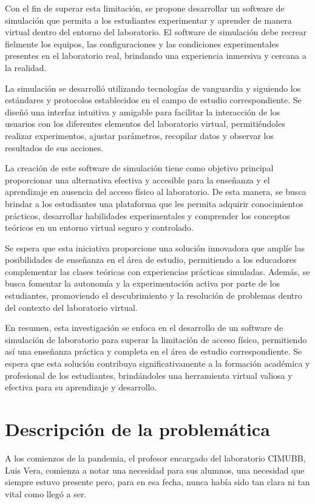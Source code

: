 Con el fin de superar esta limitación, se propone desarrollar un software de simulación que permita a los estudiantes experimentar y aprender de manera virtual dentro del entorno del laboratorio. El software de simulación debe recrear fielmente los equipos, las configuraciones y las condiciones experimentales presentes en el laboratorio real, brindando una experiencia inmersiva y cercana a la realidad.

La simulación se desarrolló utilizando tecnologías de vanguardia y siguiendo los estándares y protocolos establecidos en el campo de estudio correspondiente. Se diseñó una interfaz intuitiva y amigable para facilitar la interacción de los usuarios con los diferentes elementos del laboratorio virtual, permitiéndoles realizar experimentos, ajustar parámetros, recopilar datos y observar los resultados de sus acciones.

La creación de este software de simulación tiene como objetivo principal proporcionar una alternativa efectiva y accesible para la enseñanza y el aprendizaje en ausencia del acceso físico al laboratorio. De esta manera, se busca brindar a los estudiantes una plataforma que les permita adquirir conocimientos prácticos, desarrollar habilidades experimentales y comprender los conceptos teóricos en un entorno virtual seguro y controlado.

Se espera que esta iniciativa proporcione una solución innovadora que amplíe las posibilidades de enseñanza en el área de estudio, permitiendo a los educadores complementar las clases teóricas con experiencias prácticas simuladas. Además, se busca fomentar la autonomía y la experimentación activa por parte de los estudiantes, promoviendo el descubrimiento y la resolución de problemas dentro del contexto del laboratorio virtual.

En resumen, esta investigación se enfoca en el desarrollo de un software de simulación de laboratorio para superar la limitación de acceso físico, permitiendo así una enseñanza práctica y completa en el área de estudio correspondiente. Se espera que esta solución contribuya significativamente a la formación académica y profesional de los estudiantes, brindándoles una herramienta virtual valiosa y efectiva para su aprendizaje y desarrollo.

\clearpage

\section{Descripción de la problemática}
A los comienzos de la pandemia, el profesor encargado del laboratorio CIMUBB, Luis Vera, comienza a notar una necesidad para sus alumnos, una necesidad que siempre estuvo presente pero, para en esa fecha, nunca había sido tan clara ni tan vital como llegó a ser.

